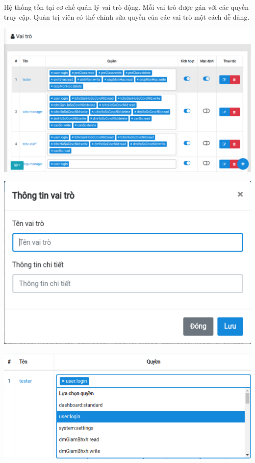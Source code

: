 Hệ thống tồn tại cơ chế quản lý vai trò động. Mỗi vai trò được gán với các quyền truy cập. Quản trị viên có thể chỉnh sửa quyền của các vai trò một cách dễ dàng.\\
\begin{center}
  \captionsetup{type=figure}
  \includegraphics[width=15cm]{img/Screen/allrole.png}
\end{center}
\begin{center}
  \captionsetup{type=figure}
  \includegraphics[width=15cm]{img/Screen/addrole.png}
\end{center}
\begin{center}
  \captionsetup{type=figure}
  \includegraphics[width=15cm]{img/Screen/ganquyen.png}
\end{center}
